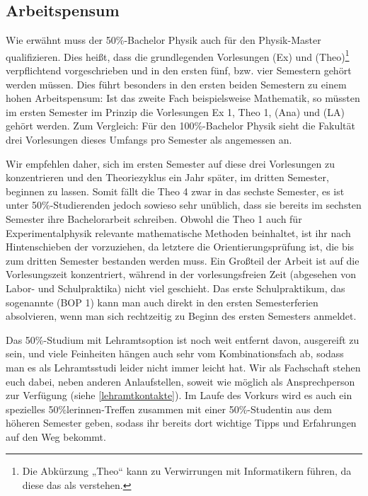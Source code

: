 \subsection{Arbeitspensum}
\vspace{-2mm}
Wie erwähnt muss der 50\%-Bachelor Physik auch für den Physik-Master qualifizieren. Dies heißt, dass die grundlegenden Vorlesungen  (\gls{Ex}) und  (\gls{Theo})\footnote{Die Abkürzung „Theo“ kann zu Verwirrungen mit Informatikern führen, da diese das als  verstehen.} verpflichtend vorgeschrieben und in den ersten fünf, bzw. vier Semestern gehört werden müssen. Dies führt besonders in den ersten beiden Semestern zu einem hohen Arbeitspensum: Ist das zweite Fach beispielsweise Mathematik, so müssten im ersten Semester im Prinzip die Vorlesungen \gls{Ex} 1, \gls{Theo} 1,  (\gls{Ana}) und  (\gls{LA}) gehört werden. Zum Vergleich: Für den 100\%-Bachelor Physik sieht die Fakultät drei Vorlesungen dieses Umfangs pro Semester als angemessen an.

Wir empfehlen daher, sich im ersten Semester auf diese drei Vorlesungen zu konzentrieren und den Theoriezyklus ein Jahr später, im dritten Semester, beginnen zu lassen. Somit fällt die \gls{Theo} 4 zwar in das sechste Semester, es ist unter 50\%-Studierenden jedoch sowieso sehr unüblich, dass sie bereits im sechsten Semester ihre Bachelorarbeit schreiben. Obwohl die \gls{Theo} 1 auch für Experimentalphysik relevante mathematische Methoden beinhaltet, ist ihr nach Hintenschieben der  vorzuziehen, da letztere die Orientierungsprüfung ist, die bis zum dritten Semester bestanden werden muss. Ein Großteil der Arbeit ist auf die Vorlesungszeit konzentriert, während in der vorlesungsfreien Zeit (abgesehen von Labor- und Schulpraktika) nicht viel geschieht. Das erste Schulpraktikum, das sogenannte  (BOP 1) kann man auch direkt in den ersten Semesterferien absolvieren, wenn man sich rechtzeitig zu Beginn des ersten Semesters anmeldet.

Das 50\%-Studium mit Lehramtsoption ist noch weit entfernt davon, ausgereift zu sein, und viele Feinheiten hängen auch sehr vom Kombinationsfach ab, sodass man es als Lehramtsstudi leider nicht immer leicht hat. Wir als Fachschaft stehen euch dabei, neben anderen Anlaufstellen, soweit wie möglich als Ansprechperson zur Verfügung (siehe \autoref{lehramtkontakte}). Im Laufe des Vorkurs wird es auch ein spezielles 50\%lerinnen-Treffen zusammen mit einer 50\%-Studentin aus dem höheren Semester geben, sodass ihr bereits dort wichtige Tipps und Erfahrungen auf den Weg bekommt.

